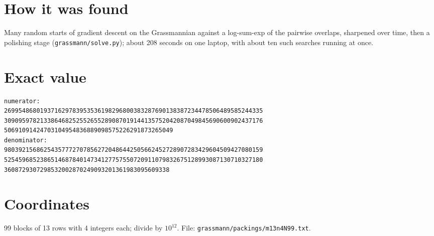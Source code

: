\documentclass[11pt,a4paper]{article}
\begin{document}
\section{How it was found}
Many random starts of gradient descent on the Grassmannian against a log-sum-exp of the pairwise overlaps, sharpened over time, then a polishing stage (\texttt{grassmann/solve.py}); about 208 seconds on one laptop, with about ten such searches running at once.


\appendix
\section{Exact value}
{\small
\begin{verbatim}
numerator:
269954868019371629783953536198296800383287690138387234478506489585244335
309095978213386468252552655289087019144135752042087049845690600902437176
50691091424703104954836889098575226291873265049
denominator:
980392156862543577727078562720486442505662452728907283429604509427080159
525459685238651468784014734127757550720911079832675128993087130710327180
3608729307298532002870249093201361983095609338
\end{verbatim}}

\section{Coordinates}
99 blocks of 13 rows with 4 integers each; divide by $10^{12}$. File: \texttt{grassmann/packings/m13n4N99.txt}.
{\tiny
\begin{multicols}{3}
\end{multicols}}
\end{document}
